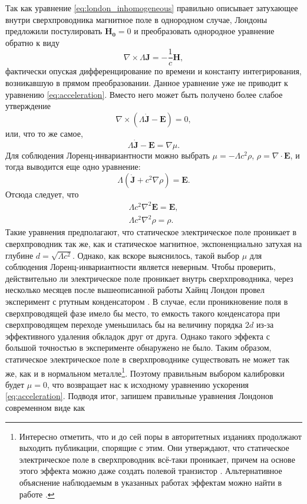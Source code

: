 \documentclass[14pt, a4paper]{extreport}
\numberwithin{equation}{section}
\begin{document}
Так как уравнение \eqref{eq:london_inhomogeneous} правильно описывает затухающее внутри сверхпроводника магнитное поле в однородном случае, Лондоны предложили постулировать $\mathbf{H_0} = 0$ и преобразовать однородное уравнение обратно к виду
\begin{equation}
	\nabla \times \Lambda \mathbf J = -\frac{1}{c} \mathbf{H},\label{eq:london_first}
\end{equation}
фактически опуская дифференцирование по времени и константу интегрирования, возникавшую в прямом преобразовании. Данное уравнение уже не приводит к уравнению \eqref{eq:acceleration}. Вместо него может быть получено более слабое утверждение
\begin{equation}
	\nabla \times (\Lambda \dot{\mathbf J} - \mathbf E)  = 0,
\end{equation}
или, что то же самое,
\begin{equation}
	 \Lambda \dot{\mathbf J} - \mathbf E = \nabla \mu. \label{eq:london_second}
\end{equation}
Для соблюдения Лоренц-инвариантности можно выбрать $\mu = -\Lambda c^2 \rho$, $\rho = \nabla\cdot\mathbf E$, и тогда выводится еще одно уравнение:
\begin{equation}
	\Lambda (\dot{\mathbf J} + c^2 \nabla \rho) = \mathbf E.
\end{equation}
Отсюда следует, что 
\begin{gather}
	\Lambda c^2 \nabla^2 \mathbf E = \mathbf E,\\
	\Lambda c^2 \nabla^2 \rho = \rho.
\end{gather}
Такие уравнения предполагают, что статическое электрическое поле проникает в сверхпроводник так же, как и статическое магнитное, экспоненциально затухая на глубине $d = \sqrt{\Lambda c^2}$. Однако, как вскоре выяснилось, такой выбор $\mu$ для соблюдения Лоренц-инвариантности является неверным. Чтобы проверить, действительно ли электрическое поле проникает внутрь сверхпроводника, через несколько месяцев после вышеописанной работы Хайнц Лондон провел эксперимент с ртутным конденсатором \cite{london1936experimental}. В случае, если проникновение поля в сверхпроводящей фазе имело бы место, то емкость такого конденсатора при сверхпроводящем переходе уменьшилась бы на величину порядка $2d$ из-за эффективного удаления обкладок друг от друга. Однако такого эффекта с большой точностью в эксперименте обнаружено не было. Таким образом, статическое электрическое поле в сверхпроводнике существовать не может так же, как и в нормальном металле\footnote{Интересно отметить, что и до сей поры в авторитетных изданиях продолжают выходить публикации, спорящие с этим. Они утверждают, что статическое электрическое поле в сверхпроводник всё-таки проникает, причем на основе этого эффекта можно даже создать полевой транзистор \cite{de2018metallic, paolucci2018ultra}. Альтернативное объяснение наблюдаемым в указанных работах эффектам можно найти в работе \cite{golokolenov2020origin}.}. Поэтому  правильным выбором калибровки будет $\mu=0$, что возвращает нас к исходному уравнению ускорения \eqref{eq:acceleration}. Подводя итог, запишем правильные уравнения Лондонов современном виде как
\end{document}
